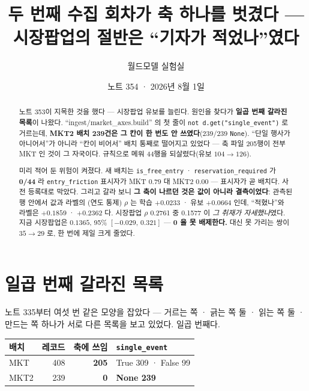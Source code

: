 \documentclass[11pt]{article}
\begin{document}
\title{두 번째 수집 회차가 축 하나를 벗겼다 --- 시장팝업의 절반은 ``기자가 적었나''였다}
\author{월드모델 실험실}
\date{노트 354 · 2026년 8월 1일}
\maketitle

\begin{abstract}
노트 353이 지목한 것을 했다 --- 시장팝업 유보를 늘린다. 원인을 찾다가
\textbf{일곱 번째 갈라진 목록}이 나왔다. ``ingest/market\_axes.build'' 의
첫 줄이 \texttt{not d.get("single\_event")} 로 거르는데, \textbf{MKT2 배치
239건은 그 칸이 한 번도 안 쓰였다}(239/239 \texttt{None}). ``단일 행사가
아니어서''가 아니라 ``칸이 비어서'' 배치 통째로 떨어지고 있었다 --- 축
파일 205행이 전부 MKT 인 것이 그 자국이다. 규칙으로 메워 44행을
되살렸다(유보 $104\to126$).

미리 적어 둔 위험이 켜졌다. 새 배치는 \texttt{is\_free\_entry} ·
\texttt{reservation\_required} 가 \textbf{0/44} 라 \texttt{entry\_friction}
표시자가 MKT $0.79$ 대 MKT2 $0.00$ --- 표시자가 곧 배치다. 사전 등록대로
막았다. 그리고 갈라 보니 \textbf{그 축이 나르던 것은 값이 아니라
결측이었다}: 관측된 행 안에서 값과 라벨의 (연도 통제) $\rho$ 는 학습
$+0.0233$ · 유보 $+0.0664$ 인데, ``적혔나''와 라벨은 $+0.1859$ ·
$\mathbf{+0.2362}$ 다. 시장팝업 $\rho$ 0.2761 중 0.1577 이 \emph{그 취재가
자세했나}였다. 지금 시장팝업은 $0.1365$, 95\% $[-0.029,\,0.321]$ ---
\textbf{0 을 못 배제한다.} 대신 못 가리는 쌍이 $35\to29$ 로, 한 번에
제일 크게 줄었다.
\end{abstract}

\section{일곱 번째 갈라진 목록}

노트 335부터 여섯 번 같은 모양을 잡았다 --- 거르는 쪽 · 긁는 쪽 둘 ·
읽는 쪽 둘 · 만드는 쪽 하나가 서로 다른 목록을 보고 있었다. 일곱 번째다.

\begin{center}
\begin{tabular}{lrrl}
\hline
배치 & 레코드 & 축에 쓰임 & \texttt{single\_event} \\
\hline
MKT  & 408 & \textbf{205} & True 309 · False 99 \\
MKT2 & 239 & \textbf{0}   & \textbf{None 239} \\
\hline
\end{tabular}
\end{center}
\end{document}
